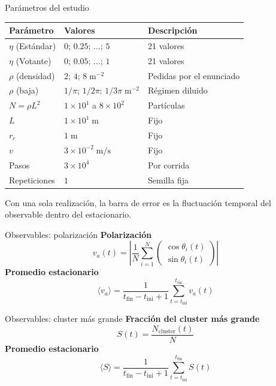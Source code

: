 \documentclass[aspectratio=169]{beamer}
\newcommand{\uu}[1]{\mathrm{#1}}       %
\begin{document}
\begin{frame}{Parámetros del estudio}
  \begin{table}
    \centering\small
    \begin{tabular}{@{}lll@{}}
      \toprule
      Parámetro & Valores & Descripción \\
      \midrule
      $\eta$ (Estándar) & $0;\,0.25;\,\ldots;\,5$ & 21 valores \\
      $\eta$ (Votante) & $0;\,0.05;\,\ldots;\,1$ & 21 valores \\
      $\rho$ (densidad) & $2;\,4;\,8\;\uu{m^{-2}}$ & Pedidas por el enunciado \\
      $\rho$ (baja) & $1/\pi;\,1/2\pi;\,1/3\pi\;\uu{m^{-2}}$ & Régimen diluido \\
      $N = \rho L^2$ & $1\times10^{1}$ a $8\times10^{2}$ & Partículas \\
      $L$ & $1\times10^{1}\;\uu{m}$ & Fijo \\
      $r_c$ & $1\;\uu{m}$ & Fijo \\
      $v$ & $3\times10^{-2}\;\uu{m/s}$ & Fijo \\
      Pasos & $3\times10^{4}$ & Por corrida \\
      Repeticiones & $1$ & Semilla fija \\
      \bottomrule
    \end{tabular}
  \end{table}
  \vspace{0.2em}
  \footnotesize
  Con una sola realización, la barra de error es la fluctuación temporal
  del observable dentro del estacionario.
\end{frame}

\begin{frame}{Observables: polarización}
  \vfill
  \Large
  \textbf{Polarización}
  \[
    v_a(t) = \left|
      \frac{1}{N} \sum_{i=1}^{N}
      \begin{pmatrix}
        \cos\theta_i(t) \\
        \sin\theta_i(t)
      \end{pmatrix}
    \right|
  \]
  \vfill
  \textbf{Promedio estacionario}
  \[
    \langle v_a\rangle =
    \frac{1}{t_{\mathrm{fin}}-t_{\mathrm{ini}}+1}
    \sum_{t=t_{\mathrm{ini}}}^{t_{\mathrm{fin}}} v_a(t)
  \]
  \vfill
\end{frame}

\begin{frame}{Observables: cluster más grande}
  \vfill
  \Large
  \textbf{Fracción del cluster más grande}
  \[
    S(t)=\frac{N_{\mathrm{cluster}}(t)}{N}
  \]
  \vfill
  \textbf{Promedio estacionario}
  \[
    \langle S\rangle =
    \frac{1}{t_{\mathrm{fin}}-t_{\mathrm{ini}}+1}
    \sum_{t=t_{\mathrm{ini}}}^{t_{\mathrm{fin}}} S(t)
  \]
  \vfill
\end{frame}
\end{document}
